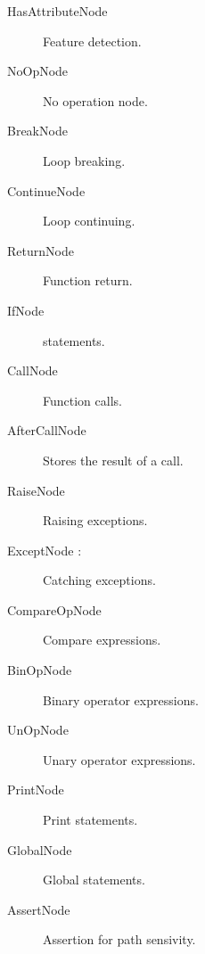 \begin{description}
	\item[HasAttributeNode ] Feature detection.
	\item[NoOpNode ] No operation node.
	\item[BreakNode ] Loop breaking.
	\item[ContinueNode ] Loop continuing.
	\item[ReturnNode ] Function return.
	\item[IfNode ]  statements.
	\item[CallNode ] Function calls.
	\item[AfterCallNode] Stores the result of a call.
	\item[RaiseNode ] Raising exceptions.
	\item[ExceptNode :] Catching exceptions.
	\item[CompareOpNode ] Compare expressions.
	\item[BinOpNode ] Binary operator expressions.
	\item[UnOpNode ] Unary operator expressions.
	\item[PrintNode ] Print statements.
	\item[GlobalNode ] Global statements.
	\item[AssertNode] Assertion for path sensivity.
\end{description}